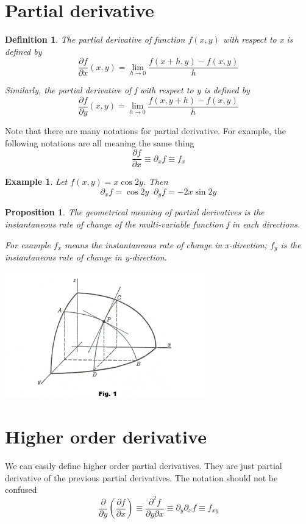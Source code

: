 \documentclass{article}
\newtheorem{definition}{Definition}
\newtheorem{ex}{Example}
\newtheorem{prop}{Proposition}
\begin{document}
\section{Partial derivative}
\begin{definition}
	The partial derivative of function $f(x,y)$ with respect to x is defined by 
	\[ \frac{\partial f}{\partial x}(x,y) = \lim_{h\to 0} \frac{f(x+h,y)-f(x,y)}{h} \]
	
	Similarly, the partial derivative of f with respect to y is defined by
	\[ \frac{\partial f}{\partial y}(x,y) = \lim_{h\to 0} \frac{f(x,y+h)-f(x,y)}{h} \]
\end{definition}

Note that there are many notations for partial derivative. For example, the following notations are all meaning the same thing
\[ \frac{\partial f}{\partial x} \equiv \partial_x f \equiv f_x \]

\begin{ex}
	Let $f(x,y) = x\cos 2y$. Then 
	\[ \partial_x f = \cos 2y\;\;\partial_y f = -2x\sin 2y \]
\end{ex}

\begin{prop}
	The geometrical meaning of partial derivatives is the instantaneous rate of change of the multi-variable function f in each directions.
	
	For example $f_x$ means the instantaneous rate of change in x-direction; $f_y$ is the instantaneous rate of change in y-direction.
	\begin{center}
		\includegraphics*{partial_derivative.png}
	\end{center}  
\end{prop}

\section{Higher order derivative}
We can easily define higher order partial derivatives. They are just partial derivative of the previous partial derivatives. The notation should not be confused
\[ \frac{\partial }{\partial y}\left( \frac{\partial f}{\partial x}\right) \equiv \frac{\partial^2 f}{\partial y\partial x} \equiv \partial_y\partial_{x} f \equiv f_{xy} \]
\end{document}
